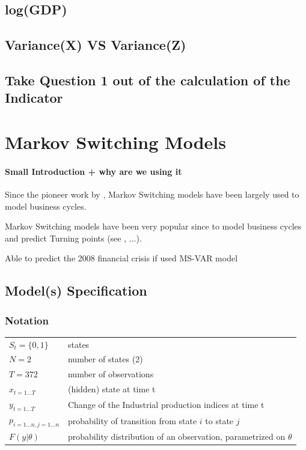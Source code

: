 \documentclass[12pt,a4paper,oneside]{book}
\begin{document}
\section{log(GDP)}


\section{Variance(X) VS Variance(Z)}

\section{Take Question 1 out of the calculation of the Indicator}

\chapter{Markov Switching Models}


\subsubsection{Small Introduction + why are we using it}

Since the pioneer work by \cite{hamilton_new_1989}, Markov Switching models have been largely used to model business cycles.


Markov Switching models have been very popular since \cite{hamilton_new_1989} to model business cycles and predict Turning points (see \cite{duprey_how_2017}, ...).

Able to predict the 2008 financial crisis if used MS-VAR model \cite{gadea_rivas_failure_2015}




\section{Model(s) Specification}

\subsection{Notation}

\begin{tabular}{l l}
    $S_t = \{0, 1\}$&   states        \\
    $N = 2$         &   number of states (2) \\
    $T = 372 $            & 	number of observations  \\
    $x_{t=1\dots T}$ & (hidden) state at time t \\
    $y_{t=1\dots T}$ 	& Change of the Industrial production indices at time t \\
    $p_{i=1\dots n,j=1\dots n}$ & probability of transition from state $i$ to state $j$ \\
    $F(y|\theta )$	&  probability distribution of an observation, parametrized on $\theta$ \\
\end{tabular}
\end{document}
